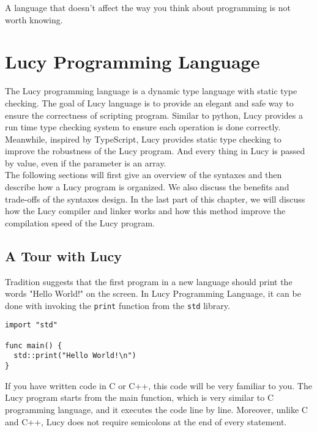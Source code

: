 \begin{savequote}[75mm]
A language that doesn't affect the way you think about programming is not worth knowing.
\end{savequote}

\chapter{Lucy Programming Language}
The Lucy programming language is a dynamic type language with static type checking. The goal of Lucy language is to provide an elegant and safe way to ensure the correctness of scripting program. Similar to python, Lucy provides a run time type checking system to ensure each operation is done correctly. Meanwhile, inspired by TypeScript, Lucy provides static type checking to improve the robustness of the Lucy program. And every thing in Lucy is passed by value, even if the parameter is an array. \\
The following sections will first give an overview of the syntaxes and then describe how a Lucy program is organized. We also discuss the benefits and trade-offs of the syntaxes design. In the last part of this chapter, we will discuss how the Lucy compiler and linker works and how this method improve the compilation speed of the Lucy program.


\section{A Tour with Lucy}
Tradition suggests that the first program in a new language should print the words "Hello World!" on the screen. In Lucy Programming Language, it can be done with invoking the \texttt{print} function from the \texttt{std} library.
\begin{lstlisting}
import "std"

func main() {
  std::print("Hello World!\n")
}
\end{lstlisting}
If you have written code in C or C++, this code will be very familiar to you. The Lucy program starts from the main function, which is very similar to C programming language, and it executes the code line by line. Moreover, unlike C and C++, Lucy does not require semicolons at the end of every statement.

